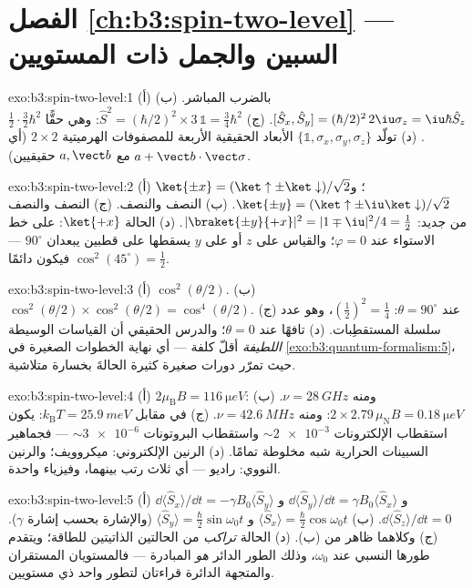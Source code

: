 \section*{الفصل \ref{ch:b3:spin-two-level} --- السبين والجمل ذات المستويين}

\begin{solution}{exo:b3:spin-two-level:1}
(أ) بالضرب المباشر. (ب) $[\hat S_x, \hat S_y] =
(\hbar/2)^2\,2\iu\sigma_z = \iu\hbar\hat S_z$. (ج) $\hat S^2 =
(\hbar/2)^2 \times 3\,\mathbb 1 = \tfrac34\hbar^2$: وهي حقًّا
$\tfrac12\cdot\tfrac32\hbar^2$. (د) تولّد $\{\mathbb 1, \sigma_x,
\sigma_y, \sigma_z\}$ الأبعاد الحقيقية الأربعة للمصفوفات الهرميتية
$2\times2$ (أي $a + \vect b\cdot\vect\sigma$ مع $a,
\vect b$ حقيقيين).
\end{solution}

\begin{solution}{exo:b3:spin-two-level:2}
(أ) $\ket{\pm x} = (\ket\uparrow \pm \ket\downarrow)/\sqrt2$؛ و
$\ket{\pm y} = (\ket\uparrow \pm \iu\ket\downarrow)/\sqrt2$. (ب)
النصف والنصف. (ج) النصف والنصف من جديد: $|\braket{\pm y}{+x}|^2 =
|1 \mp \iu|^2/4 = \tfrac12$. (د) الحالة $\ket{+x}$: على خط الاستواء عند $\varphi =
0$؛ والقياس على $z$ أو على $y$ يسقطها على قطبين يبعدان $90^\circ$
--- فيكون دائمًا $\cos^2(45^\circ) = \tfrac12$.
\end{solution}

\begin{solution}{exo:b3:spin-two-level:3}
(أ) $\cos^2(\theta/2)$. (ب) $\cos^2(\theta/2) \times
\cos^2(\theta/2) = \cos^4(\theta/2)$. (ج) عند $\theta = 90^\circ$:
$(\tfrac12)^2 = \tfrac14$، وهو عدد سلسلة المستقطِبات. (د)
تافهًا عند $\theta = 0$؛ والدرس الحقيقي أن القياسات الوسيطة
\emph{اللطيفة} أقلّ كلفة --- أي نهاية الخطوات الصغيرة في
\cref{exo:b3:quantum-formalism:5}، حيث تمرّر دورات صغيرة كثيرة
الحالةَ بخسارة متلاشية.
\end{solution}

\begin{solution}{exo:b3:spin-two-level:4}
(أ) $2\mu_{\text{B}}B = \qty{116}{\micro eV}$: ومنه $\nu =
\qty{28}{GHz}$. (ب) $2 \times 2.79\,\mu_{\text{N}}B =
\qty{0.18}{\micro eV}$: ومنه $\nu = \qty{42.6}{MHz}$. (ج) في مقابل
$k_{\text{B}}T = \qty{25.9}{meV}$: يكون استقطاب الإلكترونات
$\sim\num{2e-3}$ واستقطاب البروتونات $\sim\num{3e-6}$ --- فجماهير
السبينات الحرارية شبه مخلوطة تمامًا. (د) الرنين الإلكتروني: ميكروويف؛
والرنين النووي: راديو --- أي ثلاث رتب بينهما، وفيزياء واحدة.
\end{solution}

\begin{solution}{exo:b3:spin-two-level:5}
(أ) $\dd\langle\hat S_x\rangle/\dd t = -\gamma B_0\langle\hat
S_y\rangle$ و $\dd\langle\hat S_y\rangle/\dd t = \gamma
B_0\langle\hat S_x\rangle$ و $\dd\langle\hat S_z\rangle/\dd t = 0$.
(ب) $\langle\hat S_x\rangle = \tfrac\hbar2\cos\omega_0t$ و
$\langle\hat S_y\rangle = \tfrac\hbar2\sin\omega_0t$ (والإشارة بحسب
إشارة $\gamma$). (ج) وكلاهما ظاهر من (ب). (د) الحالة
\emph{تراكب} من الحالتين الذاتيتين للطاقة؛ ويتقدم طورها
النسبي عند $\omega_0$، وذلك الطور الدائر \emph{هو}
المبادرة --- فالمستويان المستقران والمتجهة الدائرة قراءتان
لتطور واحد ذي مستويين.
\end{solution}

